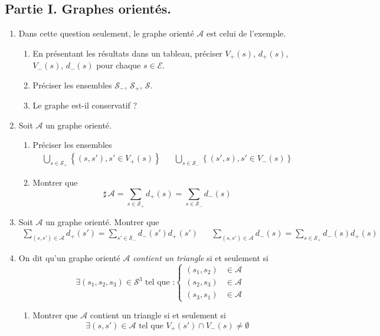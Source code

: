 \subsection*{Partie I. Graphes orientés.}
\begin{enumerate}
\item Dans cette question seulement, le graphe orienté $\mathcal{A}$ est celui de l'exemple.
\begin{enumerate}
 \item En présentant les résultats dans un tableau, préciser $V_+(s)$, $d_+(s)$, $V_-(s)$, $d_-(s)$ pour chaque $s\in \mathcal{E}$.
 \item Préciser les ensembles $\mathcal{S}_-$, $\mathcal{S}_+$, $\mathcal{S}$.
 \item Le graphe est-il conservatif ?
\end{enumerate}  

\item Soit $\mathcal{A}$ un graphe orienté.
\begin{enumerate}
 \item Préciser les ensembles
\begin{align*}
 \bigcup_{s\in\mathcal{S}_+}\left\lbrace (s,s'), s'\in V_+(s)\right\rbrace
& &
 \bigcup_{s\in\mathcal{S}_-}\left\lbrace (s',s), s'\in V_-(s)\right\rbrace 
\end{align*}
\item Montrer que 
\begin{displaymath}
 \sharp \, \mathcal{A} =
\sum_{s\in \mathcal S_+}d_+(s) = \sum_{s\in \mathcal S_-}d_-(s)
\end{displaymath}

\end{enumerate}


\item Soit $\mathcal{A}$ un graphe orienté. Montrer que
\begin{align*}
 \sum_{(s,s')\in \mathcal A}d_+(s') = \sum _{s'\in \mathcal S_-}d_-(s')d_+(s')
&  &
 \sum_{(s,s')\in \mathcal A}d_-(s) = \sum _{s\in \mathcal S_+}d_-(s)d_+(s)
\end{align*}

\item On dit qu'un graphe orienté $\mathcal{A}$ \emph{contient un triangle} si et seulement si
\begin{displaymath}
 \exists (s_1,s_2,s_3)\in \mathcal{S}^3 \text{ tel que :}
\left\lbrace
\begin{aligned}
 (s_1,s_2) &\in \mathcal{A} \\
 (s_2,s_3) &\in \mathcal{A} \\
 (s_3,s_1) &\in \mathcal{A} 
\end{aligned}
 \right. 
\end{displaymath}
\begin{enumerate}
 \item Montrer que $\mathcal A$ contient un triangle si et seulement si
\begin{displaymath}
 \exists (s,s')\in \mathcal{A} \text{ tel que } V_+(s')\cap V_-(s) \neq \emptyset
\end{displaymath}


\end{enumerate}
\end{enumerate}
